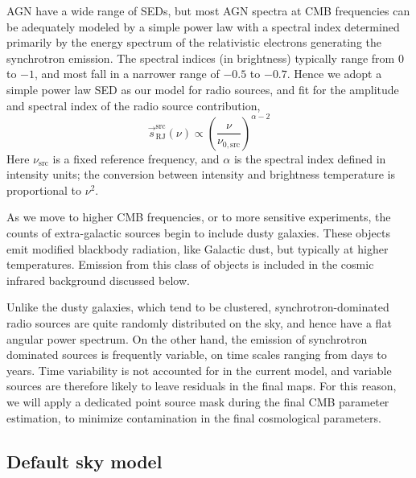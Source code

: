 \documentclass[twocolumn]{aa}
\newcommand{\s}[0]{\vec{s}}
\begin{document}
AGN have a wide range
of SEDs, but most AGN spectra at CMB frequencies can be adequately
modeled by a simple power law with a spectral index determined primarily
by the energy spectrum of the relativistic electrons generating the
synchrotron emission. The spectral indices (in brightness) typically
range from 0 to $-1$, and most fall in a narrower range of $-0.5$ to $-0.7$.
Hence we adopt a simple power law SED as our model for radio sources,
and fit for the amplitude and spectral index of the radio source
contribution, 
\begin{equation}
\s^{\mathrm{src}}_{\mathrm{RJ}}(\nu) \propto \left(\frac{\nu}{\nu_{0,\mathrm{src}}} \right)^{\alpha-2}
\label{eq:ptsrc}
\end{equation}
Here $\nu_{\mathrm{src}}$ is a fixed reference frequency, and $\alpha$
is the spectral index defined in intensity units; the conversion
between intensity and brightness temperature is proportional to
$\nu^2$. 

As we move to higher CMB frequencies, or to more sensitive
experiments, the counts of extra-galactic sources begin to include dusty
galaxies.  These objects emit modified blackbody radiation, like
Galactic dust, but typically at higher temperatures. Emission from
this class of objects is included in the cosmic infrared background
discussed below.

Unlike the dusty galaxies, which tend to be clustered, synchrotron-dominated
radio sources are quite randomly distributed on the sky, and hence have a flat 
angular power spectrum. On the other hand, the emission of synchrotron dominated 
sources is frequently variable, on time scales ranging from days to
years. Time variability is not accounted for in the current model, and
variable sources are therefore likely to leave residuals in the final
maps. For this reason, we will apply a dedicated point source mask
during the final CMB parameter estimation, to minimize contamination
in the final cosmological parameters.

\subsection{Default sky model}
\label{sec:default_sky_model}
\end{document}
